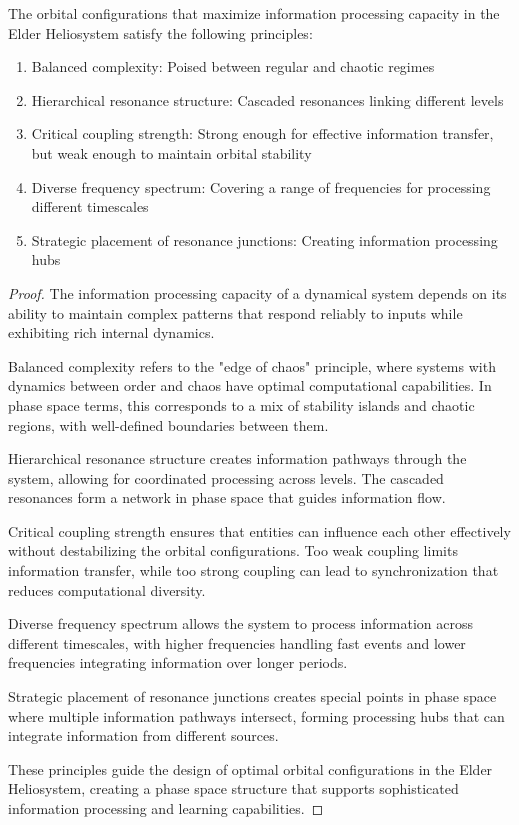 \begin{theorem}
The orbital configurations that maximize information processing capacity in the Elder Heliosystem satisfy the following principles:
\begin{enumerate}
    \item Balanced complexity: Poised between regular and chaotic regimes
    \item Hierarchical resonance structure: Cascaded resonances linking different levels
    \item Critical coupling strength: Strong enough for effective information transfer, but weak enough to maintain orbital stability
    \item Diverse frequency spectrum: Covering a range of frequencies for processing different timescales
    \item Strategic placement of resonance junctions: Creating information processing hubs
\end{enumerate}
\end{theorem}

\begin{proof}
The information processing capacity of a dynamical system depends on its ability to maintain complex patterns that respond reliably to inputs while exhibiting rich internal dynamics.

Balanced complexity refers to the "edge of chaos" principle, where systems with dynamics between order and chaos have optimal computational capabilities. In phase space terms, this corresponds to a mix of stability islands and chaotic regions, with well-defined boundaries between them.

Hierarchical resonance structure creates information pathways through the system, allowing for coordinated processing across levels. The cascaded resonances form a network in phase space that guides information flow.

Critical coupling strength ensures that entities can influence each other effectively without destabilizing the orbital configurations. Too weak coupling limits information transfer, while too strong coupling can lead to synchronization that reduces computational diversity.

Diverse frequency spectrum allows the system to process information across different timescales, with higher frequencies handling fast events and lower frequencies integrating information over longer periods.

Strategic placement of resonance junctions creates special points in phase space where multiple information pathways intersect, forming processing hubs that can integrate information from different sources.

These principles guide the design of optimal orbital configurations in the Elder Heliosystem, creating a phase space structure that supports sophisticated information processing and learning capabilities.
\end{proof}

